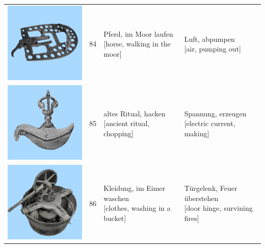 \documentclass[
  english,
  doc,12pt,twoside,floatsintext]{apa7}
\begin{document}
\begin{center}
\begin{ThreePartTable}
{\begin{longtable}{llll}
\includegraphics[valign=c, scale=0.23]{../materials/unfamiliar/84.png} & 84 & \makecell[l]{Pferd, im Moor laufen\\{[horse, walking in the moor]}} & \makecell[l]{Luft, abpumpen\\{[air, pumping out]}}\\
\includegraphics[valign=c, scale=0.23]{../materials/unfamiliar/85.png} & 85 & \makecell[l]{altes Ritual, hacken\\{[ancient ritual, chopping]}} & \makecell[l]{Spannung, erzeugen\\{[electric current, making]}}\\
\includegraphics[valign=c, scale=0.23]{../materials/unfamiliar/86.png} & 86 & \makecell[l]{Kleidung, im Eimer waschen\\{[clothes, washing in a bucket]}} & \makecell[l]{Türgelenk, Feuer überstehen\\{[door hinge, survining fires]}}\\

\end{longtable}}
\end{ThreePartTable}
\end{center}
\end{document}
